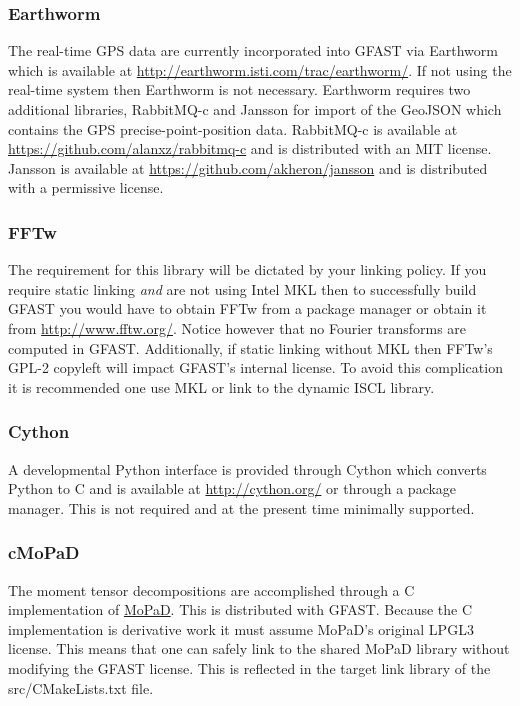 \documentclass[12pt]{article}
\begin{document}
\subsubsection{Earthworm}
The real-time GPS data are currently incorporated into GFAST via Earthworm which is
available at \url{http://earthworm.isti.com/trac/earthworm/}.  If not using the real-time
system then Earthworm is not necessary.  Earthworm requires two
additional libraries, RabbitMQ-c and Jansson for import of the GeoJSON which contains the GPS
precise-point-position data.  RabbitMQ-c 
is available at \url{https://github.com/alanxz/rabbitmq-c} and is distributed with an 
MIT license.  Jansson is available at \url{https://github.com/akheron/jansson} and
is distributed with a permissive license. 

\subsubsection{FFTw}
The requirement for this library will be dictated by your linking policy.  If you require 
static linking \emph{and} are not using Intel MKL then to successfully build GFAST you would 
have to obtain FFTw from a package manager or obtain it from \url{http://www.fftw.org/}.
Notice however that no Fourier transforms are computed in GFAST.  Additionally, if static
linking without MKL then FFTw's GPL-2 copyleft will impact GFAST's internal license.
To avoid this complication it is recommended one use MKL or link to the dynamic ISCL library.  

\subsubsection{Cython}
A developmental Python interface is provided through Cython which converts Python to C and is 
available at \url{http://cython.org/} or through a package manager.  This is not required and
at the present time minimally supported.

\subsubsection{cMoPaD}
The moment tensor decompositions are accomplished through a C implementation of 
\href{https://github.com/geophysics/MoPaD}{MoPaD}.  This is distributed with GFAST.  
Because the C implementation is derivative work it must assume MoPaD's original 
LPGL3 license.  This means that one can safely link to the shared MoPaD library without
modifying the GFAST license.  This is reflected in the target link library of the 
src/CMakeLists.txt  file.
\end{document}
